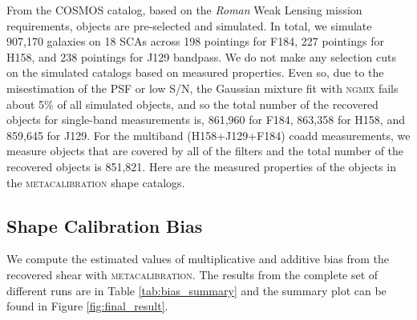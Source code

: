 \documentclass[fleqn,usenatbib]{mnras}
\begin{document}
From the COSMOS catalog, based on the \emph{Roman} Weak Lensing mission requirements, objects are pre-selected and simulated. In total, we simulate 907,170 galaxies on 18 SCAs across 198 pointings for F184, 227 pointings for H158, and 238 pointings for J129 bandpass. We do not make any selection cuts on the simulated catalogs based on measured properties. Even so, due to the misestimation of the PSF or low S/N, the Gaussian mixture fit with \textsc{ngmix} fails about 5\% of all simulated objects, and so the total number of the recovered objects for single-band measurements is, 861,960 for F184, 863,358 for H158, and 859,645 for J129. For the multiband (H158+J129+F184) coadd measurements, we measure objects that are covered by all of the filters and the total number of the recovered objects is 851,821.
Here are the measured properties of the objects in the \textsc{metacalibration} shape catalogs. 




\subsection{Shape Calibration Bias}
\label{subsec:shapes}
We compute the estimated values of multiplicative and additive bias from the recovered shear with \textsc{metacalibration}. The results from the complete set of different runs are in Table \ref{tab:bias_summary} and the summary plot can be found in Figure \ref{fig:final_result}.  
\end{document}
